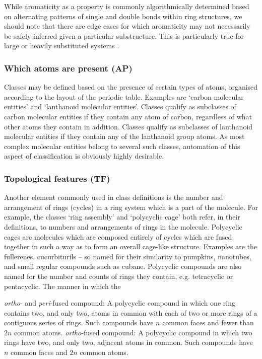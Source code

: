 \documentclass[10pt]{bmc_article}
\newenvironment{bmcformat}{\baselineskip20pt\sloppy\setboolean{publ}{false}}{\baselineskip20pt\sloppy}
\begin{document}
\begin{bmcformat}
While aromaticity as a property is commonly algorithmically determined based on alternating patterns of single and double bonds within ring structures, we should note that there are edge cases for which aromaticity may not necessarily be safely inferred given a particular substructure. This is particularly true for large or heavily substituted systems \cite{rzepa2006}. %


\subsubsection*{Which atoms are present (AP)}

Classes may be defined based on the presence of certain types of atoms, organised according to the layout of the periodic table.  Examples are `carbon molecular entities' and `lanthanoid molecular entities'. Classes qualify as subclasses of carbon molecular entities if they contain any atom of carbon, regardless of what other atoms they contain in addition.  Classes qualify as subclasses of lanthanoid molecular entities if they contain any of the lanthanoid group atoms.  As most complex molecular entities belong to several such classes, automation of this aspect of classification is obviously highly desirable. 


\subsubsection*{Topological features (TF)}

Another element commonly used in class definitions is the number and arrangement of rings (cycles) in a ring system which is a part of the molecule. For example, the classes `ring assembly' and `polycyclic cage' both refer, in their definitions, to numbers and arrangements of rings in the molecule. Polycyclic cages are molecules which are composed entirely of cycles which are fused together in such a way as to form an overall cage-like structure.  Examples are the fullerenes, cucurbiturils -- so named for their similarity to pumpkins, nanotubes, and small regular compounds such as cubane.  Polycyclic compounds are also named for the number and counts of rings they contain, e.g. tetracyclic or  pentacyclic. The manner in which the 

\textit{ortho}- and \textit{peri}-fused compound: A polycyclic compound in which one ring contains two, and only two, atoms in common with each of two or more rings of a contiguous series of rings. Such compounds have $n$ common faces and fewer than $2n$ common atoms.  \textit{ortho}-fused compound: A polycyclic compound in which two rings have two, and only two, adjacent atoms in common. Such compounds have $n$ common faces and $2n$ common atoms.


\end{bmcformat}
\end{document}
